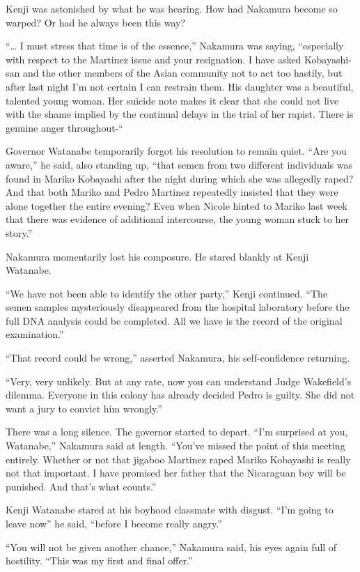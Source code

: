 \documentclass[]{article}
\begin{document}
{Kenji was astonished by what he was hearing. How had Nakamura become so warped? Or had he always been this way?

“… I must stress that time is of the essence,” Nakamura was saying, “especially with respect to the Martinez issue and your resignation. I have asked Kobayashi-san and the other members of the Asian community not to act too hastily, but after last night I’m not certain I can restrain them. His daughter was a beautiful, talented young woman. Her suicide note makes it clear that she could not live with the shame implied by the continual delays in the trial of her rapist. There is genuine anger throughout-“

Governor Watanabe temporarily forgot his resolution to remain quiet. “Are you aware,” he said, also standing up, “that semen from two different individuals was found in Mariko Kobayashi after the night during which she was allegedly raped? And that both Mariko and Pedro Martinez repeatedly insisted that they were alone together the entire evening? Even when Nicole hinted to Mariko last week that there was evidence of additional intercourse, the young woman stuck to her story.”

Nakamura momentarily lost his composure. He stared blankly at Kenji Watanabe.

“We have not been able to identify the other party,” Kenji continued. “The semen samples mysteriously disappeared from the hospital laboratory before the full DNA analysis could be completed. All we have is the record of the original examination.”

“That record could be wrong,” asserted Nakamura, his self-confidence returning.

“Very, very unlikely. But at any rate, now you can understand Judge Wakefield’s dilemma. Everyone in this colony has already decided Pedro is guilty. She did not want a jury to convict him wrongly.”

There was a long silence. The governor started to depart. “I’m surprised at you, Watanabe,” Nakamura said at length. “You’ve missed the point of this meeting entirely. Whether or not that jigaboo Martinez raped Mariko Kobayashi is really not that important. I have promised her father that the Nicaraguan boy will be punished. And that’s what counts.”

Kenji Watanabe stared at his boyhood classmate with disgust. “I’m going to leave now” he said, “before I become really angry.”

“You will not be given another chance,” Nakamura said, his eyes again full of hostility. “This was my first and final offer.”

}
\end{document}
